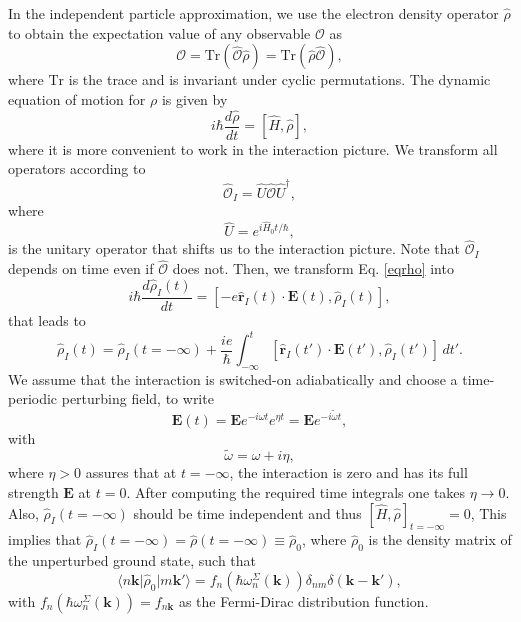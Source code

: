 In the independent particle approximation, we use the electron density operator
$\hat{\rho}$ to obtain the expectation value of any observable $\mathcal{O}$ as
\begin{equation}\label{traza}
\mathcal{O}
= \mathrm{Tr}(\hat{\mathcal{O}}\hat{\rho})
= \mathrm{Tr}(\hat{\rho}\hat{\mathcal{O}}),
\end{equation}
where $\mathrm{Tr}$ is the trace and is invariant under cyclic permutations.
The dynamic equation of motion for $\rho$ is given by
\begin{equation}\label{eqrho}
i\hbar \frac{d\hat{\rho}}{dt} = \left[\hat{H},\hat{\rho}\right],
\end{equation}
where it is more convenient to work in the interaction picture. We transform all
operators according to
\begin{equation}\label{ip}
\hat{\mathcal{O}}_{I} = \hat{U}\hat{\mathcal{O}}\hat{U}^{\dagger},
\end{equation}
where
\begin{equation}\label{ou}
\hat{U} = e^{i\hat{H}_{0}t/\hbar},
\end{equation}
is the unitary operator that shifts us to the interaction picture. Note that
$\hat{\mathcal{O}}_{I}$ depends on time even if $\hat{\mathcal{O}}$ does not.
Then, we transform Eq. \eqref{eqrho} into
\begin{equation}\label{intrho}
i\hbar\frac{d\hat{\rho}_{I}(t)}{dt}
= \left[-e\hat{\mathbf{r}}_{I}(t)\cdot\mathbf{E}(t),\hat{\rho}_{I}(t)\right],
\end{equation}
that leads to
\begin{equation}\label{intrho2}
\hat{\rho}_{I}(t)
= \hat{\rho}_{I}(t = -\infty)
+ \frac{ie}{\hbar}\int_{-\infty}^{t}
  \left[\hat{\mathbf{r}}_{I}(t')\cdot\mathbf{E}(t'),\hat{\rho}_{I}(t')\right]
   \,dt'.
\end{equation}
We assume that the interaction is switched-on adiabatically and choose a
time-periodic perturbing field, to write
\begin{equation}\label{efield}
\mathbf{E}(t)
= \mathbf{E} e^{-i\omega t}e^{\eta t}
= \mathbf{E} e^{-i\tilde{\omega} t},
\end{equation}
with
\begin{equation}\label{got}
\tilde{\omega} =\omega + i\eta,
\end{equation} 
where $\eta > 0$ assures that at $t = -\infty$, the interaction is zero and has
its full strength $\mathbf{E}$ at $t = 0$. After computing the required time
integrals one takes $\eta\to 0$. Also, $\hat{\rho}_{I}(t = -\infty)$ should be
time independent and thus $[\hat{H},\hat{\rho}]_{t = -\infty} = 0$, This implies
that $\hat{\rho}_{I}(t = -\infty) = \hat{\rho}(t =
-\infty)\equiv\hat{\rho}_{0}$, where $\hat{\rho}_{0}$ is the density matrix of
the unperturbed ground state, such that
\begin{equation}\label{nrhon}
\langle n\mathbf{k}\vert \hat{\rho}_{0} \vert m\mathbf{k}'\rangle
= f_{n}\left(\hbar\omega^{\Sigma}_{n}(\mathbf{k})\right)
\delta_{nm}\delta(\mathbf{k}-\mathbf{k}'),
\end{equation}
with $f_{n}(\hbar\omega^{\Sigma}_{n}(\mathbf{k})) = f_{n\mathbf{k}}$ as the
Fermi-Dirac distribution function.

